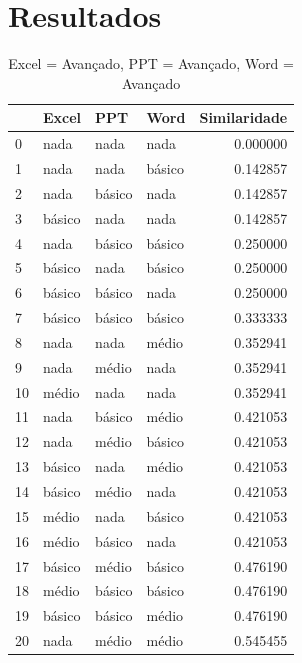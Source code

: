 \documentclass[]{article}
\begin{document}
	\section{Resultados}
	
	
	\begin{longtable}{|llll|r|} 
		\caption{Excel = Avançado, PPT = Avançado, Word = Avançado}
		\label{variability_impl_mech}
		\endfirsthead
		\endhead
		
		\hline
		{} & Excel     & PPT       & Word      & Similaridade \\
		\hline
		0  & nada      & nada      & nada      & 0.000000     \\
		1  & nada      & nada      & básico   & 0.142857     \\
		2  & nada      & básico   & nada      & 0.142857     \\
		3  & básico   & nada      & nada      & 0.142857     \\
		4  & nada      & básico   & básico   & 0.250000     \\
		5  & básico   & nada      & básico   & 0.250000     \\
		6  & básico   & básico   & nada      & 0.250000     \\
		7  & básico   & básico   & básico   & 0.333333     \\
		8  & nada      & nada      & médio    & 0.352941     \\
		9  & nada      & médio    & nada      & 0.352941     \\
		10 & médio    & nada      & nada      & 0.352941     \\
		11 & nada      & básico   & médio    & 0.421053     \\
		12 & nada      & médio    & básico   & 0.421053     \\
		13 & básico   & nada      & médio    & 0.421053     \\
		14 & básico   & médio    & nada      & 0.421053     \\
		15 & médio    & nada      & básico   & 0.421053     \\
		16 & médio    & básico   & nada      & 0.421053     \\
		17 & básico   & médio    & básico   & 0.476190     \\
		18 & médio    & básico   & básico   & 0.476190     \\
		19 & básico   & básico   & médio    & 0.476190     \\
		20 & nada      & médio    & médio    & 0.545455     \\

\end{longtable}
\end{document}
